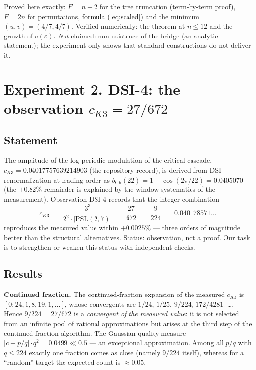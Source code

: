 \documentclass[11pt,a4paper]{article}
\begin{document}
\begin{honestybox}
Proved here exactly: $F = n+2$ for the tree truncation (term-by-term proof),
$F = 2n$ for permutations, formula (\ref{eq:scaled}) and the minimum
$(u,v) = (4/7,4/7)$. Verified numerically: the theorem at $n \le 12$ and the
growth of $e(\varepsilon)$. \emph{Not} claimed: non-existence of the bridge
(an analytic statement); the experiment only shows that standard constructions
do not deliver it.
\end{honestybox}

\section{Experiment 2. DSI-4: the observation $c_{K3} = 27/672$}\label{sec:dsi4}

\subsection{Statement}

The amplitude of the log-periodic modulation of the critical cascade,
$c_{K3} = 0.04017757639214903$ (the repository record), is derived from
DSI renormalization at leading order as $b_{\mathrm{Ch}}(22) =
1 - \cos(2\pi/22) = 0.0405070$ (the $+0.82\%$ remainder is explained by the
window systematics of the measurement). Observation DSI-4 records that the
integer combination
\begin{equation}\label{eq:dsi4}
c_{K3} \;=\; \frac{3^3}{2^2\cdot|\mathrm{PSL}(2,7)|} \;=\; \frac{27}{672} \;=\; \frac{9}{224} \;=\; 0.040178571\ldots
\end{equation}
reproduces the measured value within $+0.0025\%$ --- three orders of magnitude
better than the structural alternatives. Status: observation, not a proof. Our
task is to strengthen or weaken this status with independent checks.

\subsection{Results}

\textbf{Continued fraction.} The continued-fraction expansion of the measured
$c_{K3}$ is $[0; 24, 1, 8, 19, 1, \dots]$, whose convergents are $1/24$,
$1/25$, \emph{$9/224$}, $172/4281$, \dots. Hence $9/224 = 27/672$ is a
\emph{convergent of the measured value}: it is not selected from an infinite
pool of rational approximations but arises at the third step of the continued
fraction algorithm. The Gaussian quality measure $|c - p/q|\cdot q^2 = 0.0499
\ll 0.5$ --- an exceptional approximation. Among all $p/q$ with $q \le 224$
exactly one fraction comes as close (namely $9/224$ itself), whereas for a
``random'' target the expected count is $\approx 0.05$.
\end{document}

